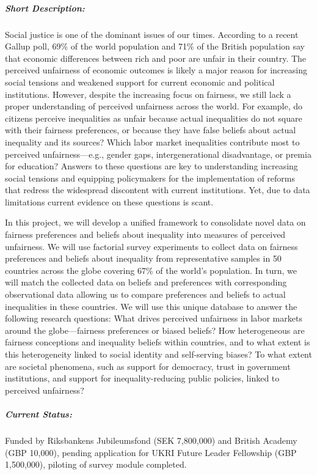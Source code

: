 \documentclass[11pt, a4paper]{article}
\begin{document}
\subparagraph{Short Description:} Social justice is one of the dominant issues of our times. According to a recent Gallup poll, 69\% of the world population and 71\% of the British population say that economic differences between rich and poor are unfair in their country. The perceived unfairness of economic outcomes is likely a major reason for increasing social tensions and weakened support for current economic and political institutions. However, despite the increasing focus on fairness, we still lack a proper understanding of perceived unfairness across the world. For example, do citizens perceive inequalities as unfair because actual inequalities do not square with their fairness preferences, or because they have false beliefs about actual inequality and its sources? Which labor market inequalities contribute most to perceived unfairness—e.g., gender gaps, intergenerational disadvantage, or premia for education? Answers to these questions are key to understanding increasing social tensions and equipping policymakers for the implementation of reforms that redress the widespread discontent with current institutions. Yet, due to data limitations current evidence on these questions is scant.

In this project, we will develop a unified framework to consolidate novel data on fairness preferences and beliefs about inequality into measures of perceived unfairness. We will use factorial survey experiments to collect data on fairness preferences and beliefs about inequality from representative samples in 50 countries across the globe covering 67\% of the world's population. In turn, we will match the collected data on beliefs and preferences with corresponding observational data allowing us to compare preferences and beliefs to actual inequalities in these countries. We will use this unique database to answer the following research questions: What drives perceived unfairness in labor markets around the globe---fairness preferences or biased beliefs? How heterogeneous are fairness conceptions and inequality beliefs within countries, and to what extent is this heterogeneity linked to social identity and self-serving biases? To what extent are societal phenomena, such as support for democracy, trust in government institutions, and support for inequality-reducing public policies, linked to perceived unfairness?

\subparagraph{Current Status:} Funded by Riksbankens Jubileumsfond (SEK 7,800,000) and British Academy (GBP 10,000), pending application for UKRI Future Leader Fellowship (GBP 1,500,000), piloting of survey module completed.
\end{document}

